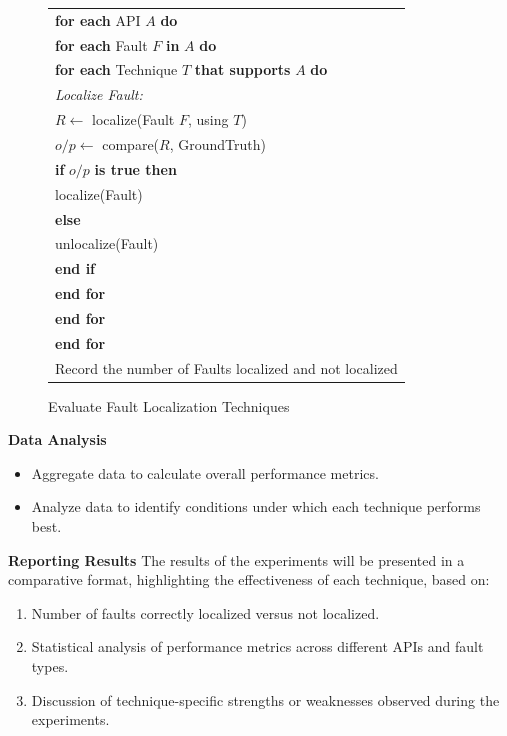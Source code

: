 \documentclass[conference]{IEEEtran}
\begin{document}
\begin{figure}[!h]
    \centering
    \caption{Evaluate Fault Localization Techniques}
    \begin{tabularx}{\columnwidth}{X}
    \textbf{for each} API \( A \) \textbf{do} \\
    \quad \textbf{for each} Fault \( F \) \textbf{in} \( A \) \textbf{do} \\
    \quad\quad \textbf{for each} Technique \( T \) \textbf{that supports} \( A \) \textbf{do} \\
    \quad\quad\quad \textit{Localize Fault:} \\
    \quad\quad\quad \( R \leftarrow \) localize(Fault \( F \), using \( T \)) \\
    \quad\quad\quad \( o/p \leftarrow \) compare(\( R \), GroundTruth) \\
    \quad\quad\quad \textbf{if} \( o/p \) \textbf{is true then} \\
    \quad\quad\quad\quad localize(Fault) \\
    \quad\quad\quad \textbf{else} \\
    \quad\quad\quad\quad unlocalize(Fault) \\
    \quad\quad\quad \textbf{end if} \\
    \quad\quad \textbf{end for} \\
    \quad \textbf{end for} \\
    \textbf{end for} \\

    Record the number of Faults localized and not localized
    \end{tabularx}
    \end{figure}
    
\textbf{Data Analysis}
    \begin{itemize}
        \item Aggregate data to calculate overall performance metrics.
        \item Analyze data to identify conditions under which each technique performs best.
    \end{itemize}
    

\textbf{Reporting Results}
The results of the experiments will be presented in a comparative format, highlighting the effectiveness of each technique, based on:
\begin{enumerate}
    \item Number of faults correctly localized versus not localized.
    \item Statistical analysis of performance metrics across different APIs and fault types.
    \item Discussion of technique-specific strengths or weaknesses observed during the experiments.
\end{enumerate}
\end{document}
